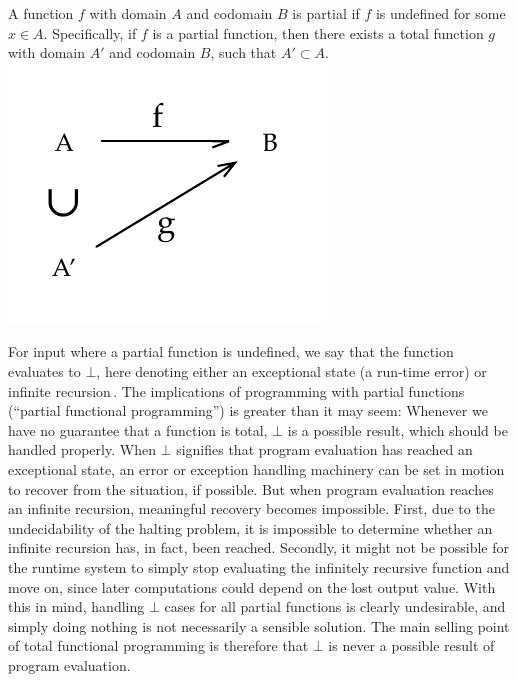 \begin{definition}
  A function $f$ with domain $A$ and codomain $B$ is partial if $f$ is undefined
  for some $x\in A$. Specifically, if $f$ is a partial function, then there
  exists a total function $g$ with domain $A'$ and codomain $B$, such that
  $A' \subset A$.
  \centering
  \includegraphics[scale=0.8]{figures/partialfunc}
\end{definition}

For input  where a partial function is undefined, we say that
the function evaluates to $\bot$, here denoting either an exceptional state (a
run-time error) or infinite recursion\,\citep{Turner04totalfunctional}. The
implications of programming with partial functions (``partial functional
programming'') is greater than it may seem: Whenever we have no guarantee that a
function is total, $\bot$ is a possible result, which should be handled
properly. When $\bot$ signifies that program evaluation has reached an
exceptional state, an error or exception handling machinery can be set in motion
to recover from the situation, if possible. But when program evaluation reaches
an infinite recursion, meaningful recovery becomes impossible. First, due to the
undecidability of the halting problem, it is impossible to determine whether an
infinite recursion has, in fact, been reached. Secondly, it might not be
possible for the runtime system to simply stop evaluating the infinitely
recursive function and move on, since later computations could depend on the lost
output value. With this in mind, handling $\bot$ cases for all partial functions
is clearly undesirable, and simply doing nothing is not necessarily a sensible
solution. The main selling point of total functional programming is therefore
that $\bot$ is never a possible result of program evaluation.

